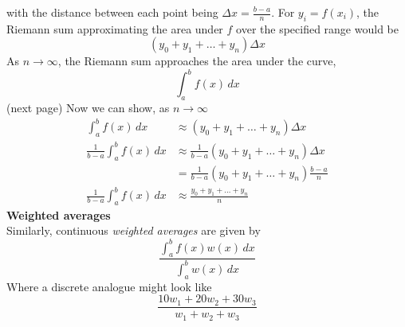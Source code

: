 \documentclass{report}
\begin{document}
with the distance between each point being $\Delta x=\frac{b-a}{n}$. 
For $y_i=f(x_i)$, the Riemann sum approximating the area under $f$ over 
the specified range would be
\begin{equation*}
(y_0+y_1+\ldots+y_n)\Delta x
\end{equation*}
As $n\to\infty$, the Riemann sum approaches the area under the curve, 
\begin{equation*}
\int_a^bf(x)\,dx
\end{equation*}
(next page)
\newpage
\noindent Now we can show, as $n\to\infty$
\begin{align*}
\int_a^bf(x)\,dx&\approx(y_0+y_1+\ldots+y_n)\Delta x\\
\frac{1}{b-a}\int_a^bf(x)\,dx&\approx
\frac{1}{b-a}(y_0+y_1+\ldots+y_n)\Delta x\\
&=\frac{1}{b-a}(y_0+y_1+\ldots+y_n)\frac{b-a}{n}\\
\frac{1}{b-a}\int_a^bf(x)\,dx&\approx\frac{y_0+y_1+\ldots+y_n}{n}
\end{align*}
\textbf{Weighted averages}\\
Similarly, continuous \textit{weighted averages} are given by
\begin{equation*}
\frac{\int_a^b f(x)w(x)\,dx}{\int_a^b w(x)\,dx}
\end{equation*}
Where a discrete analogue might look like
\begin{equation*}
\frac{10w_1+20w_2+30w_3}{w_1+w_2+w_3}
\end{equation*}
\newpage
\end{document}
